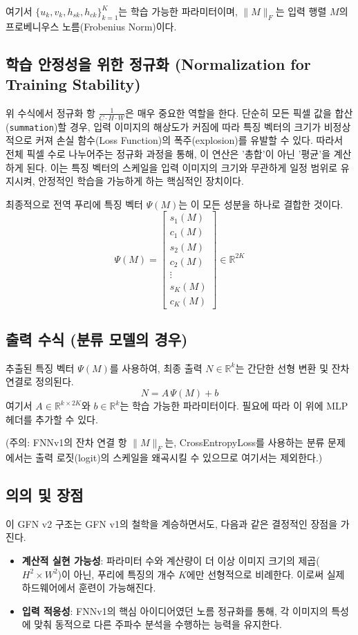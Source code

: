 \documentclass{book}
\begin{document}
여기서 $\{u_k, v_k, h_{sk}, h_{ck}\}_{k=1}^{K}$는 학습 가능한 파라미터이며, $\lVert M \rVert_F$는 입력 행렬 $M$의 프로베니우스 노름(Frobenius Norm)이다.

\subsection{학습 안정성을 위한 정규화 (Normalization for Training Stability)}
위 수식에서 정규화 항 $\frac{1}{C \cdot H \cdot W}$은 매우 중요한 역할을 한다.
단순히 모든 픽셀 값을 합산(\texttt{summation})할 경우, 입력 이미지의 해상도가 커짐에 따라 특징 벡터의 크기가 비정상적으로 커져 손실 함수(Loss Function)의 폭주(explosion)를 유발할 수 있다.
따라서 전체 픽셀 수로 나누어주는 정규화 과정을 통해, 이 연산은 '총합'이 아닌 '평균'을 계산하게 된다. 
이는 특징 벡터의 스케일을 입력 이미지의 크기와 무관하게 일정 범위로 유지시켜, 안정적인 학습을 가능하게 하는 핵심적인 장치이다.

최종적으로 전역 푸리에 특징 벡터 $\Psi(M)$는 이 모든 성분을 하나로 결합한 것이다.
\[
\Psi(M) = 
\begin{bmatrix}
s_1(M) \\ c_1(M) \\ s_2(M) \\ c_2(M) \\ \vdots \\ s_K(M) \\ c_K(M)
\end{bmatrix}
\in \mathbb{R}^{2K}
\]

\subsection{출력 수식 (분류 모델의 경우)}
추출된 특징 벡터 $\Psi(M)$를 사용하여, 최종 출력 $N \in \mathbb{R}^k$는 간단한 선형 변환 및 잔차 연결로 정의된다.
\[
N = A \, \Psi(M) + b
\]
여기서 $A \in \mathbb{R}^{k \times 2K}$와 $b \in \mathbb{R}^k$는 학습 가능한 파라미터이다. 필요에 따라 이 위에 MLP 헤더를 추가할 수 있다.

(주의: FNNv1의 잔차 연결 항 $\lVert M \rVert_F$는, CrossEntropyLoss를 사용하는 분류 문제에서는 출력 로짓(logit)의 스케일을 왜곡시킬 수 있으므로 여기서는 제외한다.)

\subsection{의의 및 장점}
이 GFN v2 구조는 GFN v1의 철학을 계승하면서도, 다음과 같은 결정적인 장점을 가진다.
\begin{itemize}
    \item \textbf{계산적 실현 가능성}: 파라미터 수와 계산량이 더 이상 이미지 크기의 제곱($H^2 \times W^2$)이 아닌, 푸리에 특징의 개수 $K$에만 선형적으로 비례한다. 이로써 실제 하드웨어에서 훈련이 가능해진다.
    \item \textbf{입력 적응성}: FNNv1의 핵심 아이디어였던 노름 정규화를 통해, 각 이미지의 특성에 맞춰 동적으로 다른 주파수 분석을 수행하는 능력을 유지한다.
\end{itemize}
\end{document}

